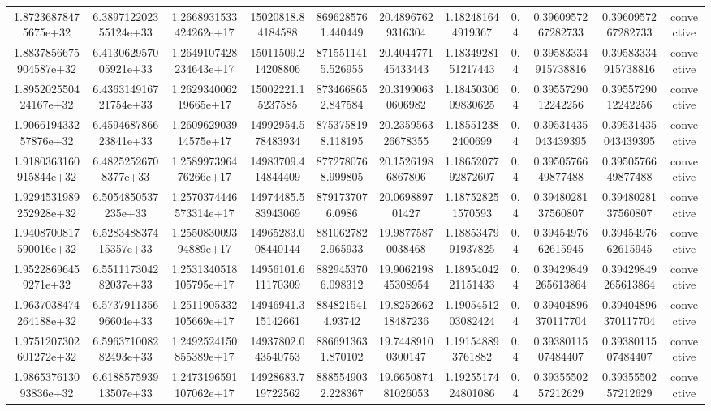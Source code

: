 \begin{table}
\begin{tabular}{ccccccccccc}
1.87236878475675e+32 & 6.389712202355124e+33 & 1.2668931533424262e+17 & 15020818.84184588 & 8696285761.440449 & 20.48967629316304 & 1.182481644919367 & 0.4 & 0.3960957267282733 & 0.3960957267282733 & convective \\
1.8837856675904587e+32 & 6.413062957005921e+33 & 1.2649107428234643e+17 & 15011509.214208806 & 8715511415.526955 & 20.404477145433443 & 1.1834928151217443 & 0.4 & 0.39583334915738816 & 0.39583334915738816 & convective \\
1.895202550424167e+32 & 6.436314916721754e+33 & 1.262934006219665e+17 & 15002221.15237585 & 8734668652.847584 & 20.31990630606982 & 1.1845030609830625 & 0.4 & 0.3955729012242256 & 0.3955729012242256 & convective \\
1.906619433257876e+32 & 6.459468786623841e+33 & 1.260962903914575e+17 & 14992954.578483934 & 8753758198.118195 & 20.235956326678355 & 1.185512382400699 & 0.4 & 0.39531435043439395 & 0.39531435043439395 & convective \\
1.9180363160915844e+32 & 6.48252526708377e+33 & 1.258997396476266e+17 & 14983709.414844409 & 8772780768.999805 & 20.15261986867806 & 1.1865207792872607 & 0.4 & 0.3950576649877488 & 0.3950576649877488 & convective \\
1.9294531989252928e+32 & 6.5054850537235e+33 & 1.2570374446573314e+17 & 14974485.583943069 & 8791737076.0986 & 20.069889701427 & 1.187528251570593 & 0.4 & 0.3948028137560807 & 0.3948028137560807 & convective \\
1.9408700817590016e+32 & 6.528348837415357e+33 & 1.255083009394889e+17 & 14965283.008440144 & 8810627822.965933 & 19.98775870038468 & 1.1885347991937825 & 0.4 & 0.3945497662615945 & 0.3945497662615945 & convective \\
1.95228696459271e+32 & 6.551117304282037e+33 & 1.2531340518105795e+17 & 14956101.611170309 & 8829453706.098312 & 19.906219845308954 & 1.1895404221151433 & 0.4 & 0.39429849265613864 & 0.39429849265613864 & convective \\
1.9637038474264188e+32 & 6.573791135696604e+33 & 1.2511905332105669e+17 & 14946941.315142661 & 8848215414.93742 & 19.825266218487236 & 1.1905451203082424 & 0.4 & 0.39404896370117704 & 0.39404896370117704 & convective \\
1.9751207302601272e+32 & 6.596371008282493e+33 & 1.2492524150855389e+17 & 14937802.043540753 & 8866913631.870102 & 19.74489100300147 & 1.191548893761882 & 0.4 & 0.3938011507484407 & 0.3938011507484407 & convective \\
1.986537613093836e+32 & 6.618857593913507e+33 & 1.2473196591107062e+17 & 14928683.719722562 & 8885549032.228367 & 19.665087481026053 & 1.1925517424801086 & 0.4 & 0.3935550257212629 & 0.3935550257212629 & convective \\

\end{tabular}
\end{table}
